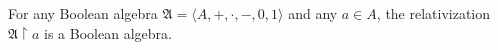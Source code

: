 For any Boolean algebra $\mathfrak{A} = \langle A, +, \cdot, -, 0, 1 \rangle$ and any $a \in A$, the relativization $\mathfrak{A} \upharpoonright a$ is a Boolean algebra.
